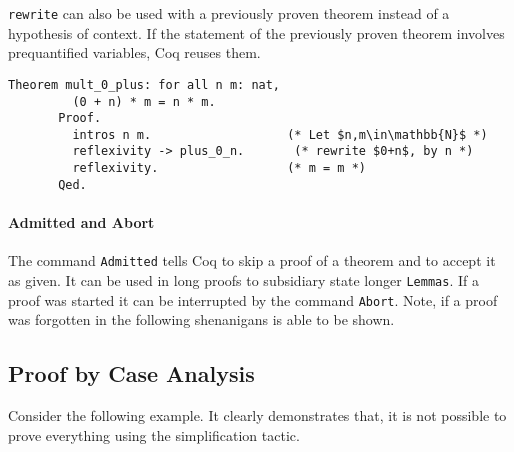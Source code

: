 	   \lstinline!rewrite! can also be used with a previously proven theorem instead of a hypothesis of context.
	   If the statement of the previously proven theorem involves prequantified variables, Coq reuses them.   
	   \begin{lstlisting}[caption=\lstinline!mult_0_plus!]
	   Theorem mult_0_plus: for all n m: nat,
	     (0 + n) * m = n * m.
	   Proof.
	     intros n m.                   (* Let $n,m\in\mathbb{N}$ *) 
	     reflexivity -> plus_0_n.       (* rewrite $0+n$, by n *)
	     reflexivity.                  (* m = m *)
	   Qed.
	   \end{lstlisting}   
	
		\paragraph{Admitted and Abort}
		
		The command \lstinline!Admitted! tells Coq to skip a proof of a theorem and to accept it as given.
		It can be used in long proofs to subsidiary state longer \lstinline!Lemmas!.
		If a proof was started it can be interrupted by the command \lstinline!Abort!.
		Note, if a proof was forgotten in the following shenanigans is able to be shown. \\
		
	\subsection{Proof by Case Analysis}
	\label{subsec:proofByCaseAnalysis}
	   Consider the following example. It clearly demonstrates that, it is not possible to prove everything using the simplification tactic.   
	   
	   
